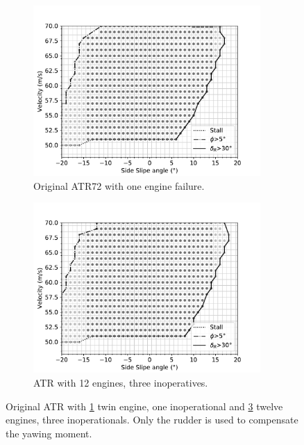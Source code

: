 \begin{figure}[hbt!]
	\centering
	\begin{subfigure}{0.49\textwidth}
		\includegraphics[width=0.95\textwidth]{originalMapBetaVelfin1Eng3RudFalse}
		\caption{Original ATR72 with one engine failure.}
		\label{fig:originalfin1_3engine}
	\end{subfigure}
	\begin{subfigure}{0.49\textwidth}
		\includegraphics[width=0.95\textwidth]{originalMapBetaVelfin1Eng15RudFalse}
		\caption{ATR with 12 engines, three inoperatives.}
		\label{fig:originalfin1_15engine}
	\end{subfigure}
	\caption{Original ATR with \ref{fig:originalfin1_3engine} twin engine, one inoperational and \ref{fig:originalfin1_15engine} twelve engines, three inoperationals. Only the rudder is used to compensate the yawing moment.}
\end{figure}

